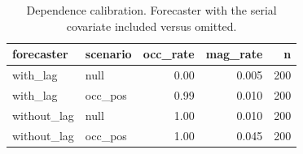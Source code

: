 \begin{table}

\caption{Dependence calibration. Forecaster with the serial covariate included versus omitted.}
\centering
\begin{tabular}[t]{llrrr}
\toprule
forecaster & scenario & occ\_rate & mag\_rate & n\\
\midrule
with\_lag & null & 0.00 & 0.005 & 200\\
with\_lag & occ\_pos & 0.99 & 0.010 & 200\\
without\_lag & null & 1.00 & 0.010 & 200\\
without\_lag & occ\_pos & 1.00 & 0.045 & 200\\
\bottomrule
\end{tabular}
\end{table}
